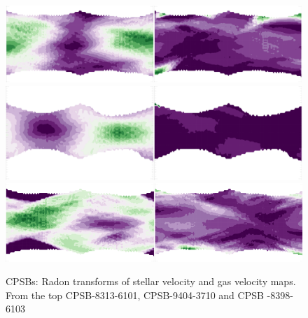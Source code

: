 

\begin{figure}
    \centering
    \includegraphics[width=\columnwidth]{images/RadonPlots/RT-snips/CPSB-8313-6101-RT-snip.png}
    \includegraphics[width=\columnwidth]{images/RadonPlots/RT-snips/CPSB-9494-3701-snip.png}
    \includegraphics[width=\columnwidth]{images/RadonPlots/RT-snips/CPSB-8398-6102-snip.png}
    \caption{CPSBs: Radon transforms of stellar velocity and gas velocity maps. From the top CPSB-8313-6101, CPSB-9404-3710 and CPSB -8398-6103}
    \label{fig:CPSB-RTs}
\end{figure}
